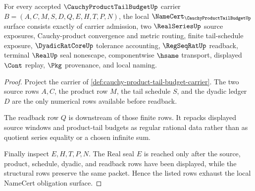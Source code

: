 \begin{theorem}
\label{thm:cauchy-product-tail-budget-namecert-obligations}
For every accepted $\CauchyProductTailBudgetUp$ carrier $B=(A,C,M,S,D,Q,E,H,T,P,N)$, the local $\NameCert_{\CauchyProductTailBudgetUp}$ surface consists exactly of carrier admission, two $\RealSeriesUp$ source exposures, Cauchy-product convergence and metric routing, finite tail-schedule exposure, $\DyadicRatCoreUp$ tolerance accounting, $\RegSeqRatUp$ readback, terminal $\RealUp$ seal nonescape, componentwise $\hsame$ transport, displayed $\Cont$ replay, $\Pkg$ provenance, and local naming.
\end{theorem}
\begin{proof}
Project the carrier of \autoref{def:cauchy-product-tail-budget-carrier}. The two source rows $A,C$, the product row $M$, the tail schedule $S$, and the dyadic ledger $D$ are the only numerical rows available before readback.

The readback row $Q$ is downstream of those finite rows. It repacks displayed source windows and product-tail budgets as regular rational data rather than as quotient series equality or a chosen infinite sum.

Finally inspect $E,H,T,P,N$. The Real seal $E$ is reached only after the source, product, schedule, dyadic, and readback rows have been displayed, while the structural rows preserve the same packet. Hence the listed rows exhaust the local NameCert obligation surface.
\end{proof}

